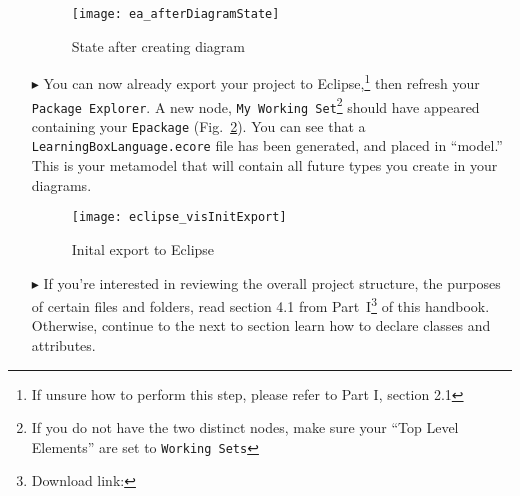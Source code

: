 \begin{itemize}
\begin{figure}[htbp]
	\centering
  \texttt{[image: ea\_afterDiagramState]}
	\caption{State after creating diagram}
	\label{fig:diagram_completed}
\end{figure}
\FloatBarrier

\item[$\blacktriangleright$] You can now already export your project to Eclipse,\footnote{If unsure how to perform this step, please
refer to Part I, section 2.1} then refresh your \texttt{Package Explorer}. A new node, \texttt{My Working Set}\footnote{If you do not have the two
distinct nodes, make sure your ``Top Level Elements'' are set to \texttt{Working Sets}} should have appeared containing your \texttt{Epackage}
(Fig.~\ref{fig:init_export}). You can see that a \texttt{LearningBoxLanguage.ecore} file has been generated, and placed in ``model.'' This is your metamodel
that will contain all future types you create in your diagrams.

\clearpage

\vspace*{2cm}

\begin{figure}[htbp]
	\centering
  \texttt{[image: eclipse\_visInitExport]}
	\caption{Inital export to Eclipse}
	\label{fig:init_export}
\end{figure}

\vspace{1cm}

\item[$\blacktriangleright$] If you're interested in reviewing the overall project structure, the purposes of certain files and folders, read section 4.1 from
Part~I\footnote{Download link: \dlPartOne} of this handbook. Otherwise, continue to the next to section learn how to declare classes and attributes.

\end{itemize}
